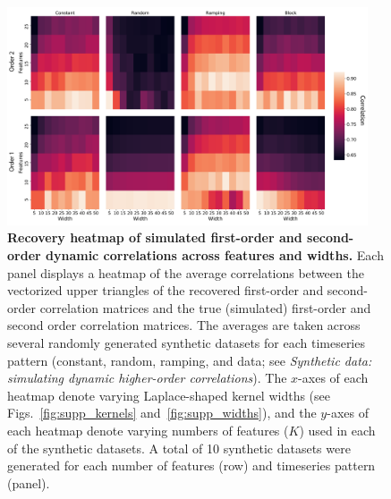 \documentclass{article}
\begin{document}
\begin{figure}[p!]
\centering
\includegraphics[width=0.95\textwidth]{figs/sim_heatmaps_features}
  \caption{\textbf{Recovery heatmap of simulated first-order and
      second-order dynamic correlations across features and widths.}  Each panel displays a
    heatmap of the average correlations
    between the vectorized upper triangles of the recovered
    first-order and second-order correlation matrices and the true
    (simulated) first-order and second order correlation matrices.
    The averages are taken across several randomly generated
    synthetic datasets for each timeseries pattern (constant, random,
    ramping, and data; see \textit{Synthetic data: simulating dynamic higher-order
      correlations}).  The $x$-axes of each heatmap denote varying
    Laplace-shaped kernel widths (see Figs.~\ref{fig:supp_kernels}
    and~\ref{fig:supp_widths}), and the $y$-axes of each heatmap
    denote varying numbers of features ($K$) used in each of the synthetic datasets.
    A total of 10 synthetic datasets were generated for each number of features
    (row) and timeseries pattern (panel).}
\label{fig:features}
\end{figure}
\end{document}
